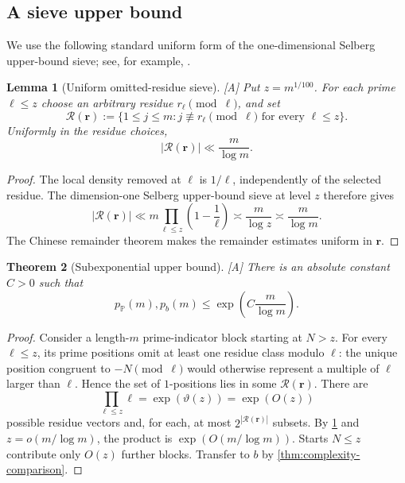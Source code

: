 \documentclass[11pt]{article}
\newtheorem{theorem}{Theorem}[section]
\newtheorem{lemma}[theorem]{Lemma}
\theoremstyle{definition}
\theoremstyle{remark}
\newcommand{\PP}{\mathbb P}
\newcommand{\status}[1]{\textnormal{\textcolor{accent}{\footnotesize[#1]}}}
\begin{document}
\subsection{A sieve upper bound}

We use the following standard uniform form of the one-dimensional Selberg upper-bound
sieve; see, for example, \cite[Chapter 6]{IK}.

\begin{lemma}[Uniform omitted-residue sieve]\label{lem:uniform-sieve}
\status{A}
Put $z=m^{1/100}$.  For each prime $\ell\le z$ choose an arbitrary residue
$r_\ell\pmod\ell$, and set
\[
 \mathcal R(\mathbf r):=
 \{1\le j\le m:j\not\equiv r_\ell\pmod\ell\text{ for every }\ell\le z\}.
\]
Uniformly in the residue choices,
\[
 |\mathcal R(\mathbf r)|\ll \frac{m}{\log m}.
\]
\end{lemma}

\begin{proof}
The local density removed at $\ell$ is $1/\ell$, independently of the selected residue.
The dimension-one Selberg upper-bound sieve at level $z$ therefore gives
\[
 |\mathcal R(\mathbf r)|
 \ll m\prod_{\ell\le z}\left(1-\frac1\ell\right)
 \asymp \frac{m}{\log z}\asymp\frac{m}{\log m}.
\]
The Chinese remainder theorem makes the remainder estimates uniform in $\mathbf r$.
\end{proof}

\begin{theorem}[Subexponential upper bound]\label{thm:complexity-upper}
\status{A}
There is an absolute constant $C>0$ such that
\begin{equation}\label{eq:complexity-upper}
 p_{\PP}(m),p_b(m)\le
 \exp\!\left(C\frac{m}{\log m}\right).
\end{equation}
\end{theorem}

\begin{proof}
Consider a length-$m$ prime-indicator block starting at $N>z$.  For every
$\ell\le z$, its prime positions omit at least one residue class modulo $\ell$: the unique
position congruent to $-N\pmod\ell$ would otherwise represent a multiple of $\ell$ larger
than $\ell$.  Hence the set of $1$-positions lies in some $\mathcal R(\mathbf r)$.
There are
\[
 \prod_{\ell\le z}\ell=\exp(\vartheta(z))=\exp(O(z))
\]
possible residue vectors and, for each, at most
$2^{|\mathcal R(\mathbf r)|}$ subsets.  By \cref{lem:uniform-sieve} and
$z=o(m/\log m)$, the product is $\exp(O(m/\log m))$.  Starts $N\le z$ contribute only
$O(z)$ further blocks.  Transfer to $b$ by \cref{thm:complexity-comparison}.
\end{proof}
\end{document}
